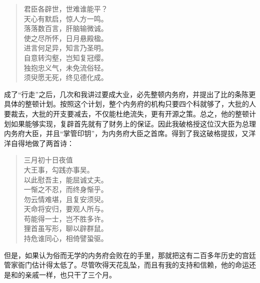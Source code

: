 \begin{quote}
	君臣各辟世，世难谁能平？\\

天心有默启，惊人方一鸣。\\

落落数百言，肝脑输微诚。\\

使之尽所怀，日月悬殿楹。\\

进言何足异，知言乃圣明。\\

自意转沟壑，岂知复冠缨。\\

独抱忠义气，未免流俗轻。\\

须臾愿无死，终见德化成。\\
\end{quote}

成了“行走”之后，几次和我讲过要成大业，必先整顿内务府，并提出了比的条陈更具体的整顿计划。按照这个计划，整个内务府的机构只要四个科就够了，大批的人要裁去，大批的开支要减去，不仅能杜绝流失，更有开源之策。总之，他的整顿计划如果能够实现，复辟首先就有了财务上的保证。因此我破格授这位汉大臣为总理内务府大臣，并且“掌管印钥”，为内务府大臣之首席。得到了我这破格提拔，又洋洋自得地做了两首诗：\\

\begin{quote}
	三月初十日夜值\\

大王事，勾践亦事吴。\\

以此慰吾主，能屈诚丈夫。\\

一惭之不忍，而终身惭乎。\\

勿云情难堪，且复安须臾。\\

天命将安归，要观人所与。\\

苟能得一士，岂不胜多许。\\

狸首虽写形，聊以辟群鼠。\\

持危谁同心，相倚譬蛩驱。\\
\end{quote}

但是，如果认为俗而无学的内务府会败在的手里，那就把这有二百多年历史的宫廷管家衙门估计得太低了。尽管吹得天花乱坠，而且有我的支持和信赖，他的命运还是和的亲戚一样，也只干了三个月。\\

